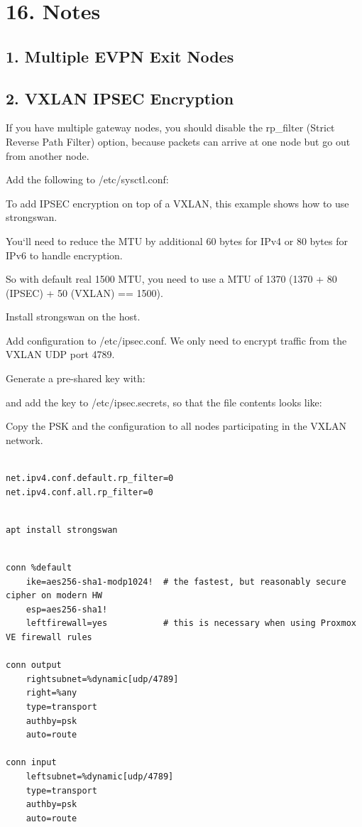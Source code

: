 \section{16. Notes}

\subsection{1. Multiple EVPN Exit Nodes}

\subsection{2. VXLAN IPSEC Encryption}

If you have multiple gateway nodes, you should disable the rp_filter (Strict Reverse Path Filter) option, because packets can arrive at one node but go out from another node.

Add the following to /etc/sysctl.conf:

To add IPSEC encryption on top of a VXLAN, this example shows how to use strongswan.

You`ll need to reduce the MTU by additional 60 bytes for IPv4 or 80 bytes for IPv6 to handle encryption.

So with default real 1500 MTU, you need to use a MTU of 1370 (1370 + 80 (IPSEC) + 50 (VXLAN) == 1500).

Install strongswan on the host.

Add configuration to /etc/ipsec.conf. We only need to encrypt traffic from the VXLAN UDP port 4789.

Generate a pre-shared key with:

and add the key to /etc/ipsec.secrets, so that the file contents looks like:

Copy the PSK and the configuration to all nodes participating in the VXLAN network.

\begin{lstlisting}

net.ipv4.conf.default.rp_filter=0
net.ipv4.conf.all.rp_filter=0

\end{lstlisting}

\begin{lstlisting}

apt install strongswan

\end{lstlisting}

\begin{lstlisting}

conn %default
    ike=aes256-sha1-modp1024!  # the fastest, but reasonably secure cipher on modern HW
    esp=aes256-sha1!
    leftfirewall=yes           # this is necessary when using Proxmox VE firewall rules

conn output
    rightsubnet=%dynamic[udp/4789]
    right=%any
    type=transport
    authby=psk
    auto=route

conn input
    leftsubnet=%dynamic[udp/4789]
    type=transport
    authby=psk
    auto=route

\end{lstlisting}

